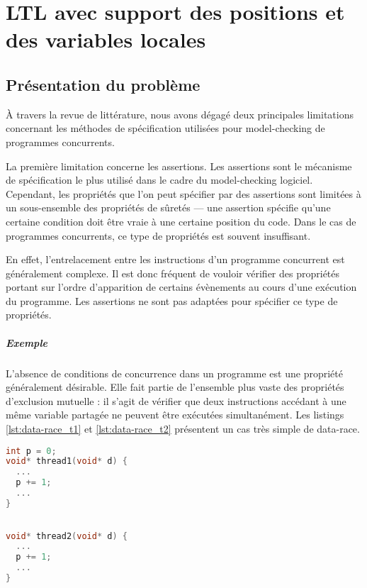 \chapter{LTL avec support des positions et des variables locales}\label{sec:Theme1}

\section{Présentation du problème}

À travers la revue de littérature, nous avons dégagé deux principales
limitations concernant les méthodes de spécification utilisées pour
model-checking de programmes concurrents.

La première limitation concerne les assertions. Les assertions sont le mécanisme
de spécification le plus utilisé dans le cadre du model-checking logiciel.
Cependant, les propriétés que l'on peut spécifier par des assertions sont
limitées à un sous-ensemble des propriétés de sûretés --- une assertion spécifie
qu'une certaine condition doit être vraie à une certaine position du code. Dans
le cas de programmes concurrents, ce type de propriétés est souvent insuffisant.

En effet, l'entrelacement entre les instructions d'un programme concurrent est
généralement complexe. Il est donc fréquent de vouloir vérifier des propriétés
portant sur l'ordre d'apparition de certains évènements au cours d'une exécution
du programme. Les assertions ne sont pas adaptées pour spécifier ce type de
propriétés.

\paragraph{Exemple}
L'absence de conditions de concurrence dans un programme est une propriété
généralement désirable. Elle fait partie de l'ensemble plus vaste des propriétés
d'exclusion mutuelle : il s'agit de vérifier que deux instructions accédant à
une même variable partagée ne peuvent être exécutées simultanément. Les listings
\ref{lst:data-race_t1} et \ref{lst:data-race_t2} présentent un cas très simple
de data-race.

\noindent\begin{minipage}{.45\textwidth}
  \begin{lstlisting}[language=C, frame=single, caption=Thread 1,
    label=lst:data-race_t1]
int p = 0;
void* thread1(void* d) {
  ...
  p += 1;
  ...
}
\end{lstlisting}
\end{minipage}\hfill
\begin{minipage}{.45\textwidth}
\begin{lstlisting}[language=C, frame=single, caption=Thread 2,
    label=lst:data-race_t2]

void* thread2(void* d) {
  ...
  p += 1;
  ...
}
\end{lstlisting}
\end{minipage}

